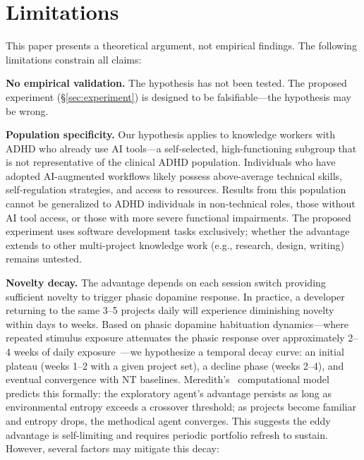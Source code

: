 \documentclass[sigconf,nonacm]{acmart}
\begin{document}
\section{Limitations}
\label{sec:limitations}

This paper presents a theoretical argument, not empirical findings. The following limitations constrain all claims:

\textbf{No empirical validation.} The hypothesis has not been tested. The proposed experiment (\S\ref{sec:experiment}) is designed to be falsifiable---the hypothesis may be wrong.

\textbf{Population specificity.} Our hypothesis applies to knowledge workers with ADHD who already use AI tools---a self-selected, high-functioning subgroup that is not representative of the clinical ADHD population. Individuals who have adopted AI-augmented workflows likely possess above-average technical skills, self-regulation strategies, and access to resources. Results from this population cannot be generalized to ADHD individuals in non-technical roles, those without AI tool access, or those with more severe functional impairments. The proposed experiment uses software development tasks exclusively; whether the advantage extends to other multi-project knowledge work (e.g., research, design, writing) remains untested.

\textbf{Novelty decay.} The advantage depends on each session switch providing sufficient novelty to trigger phasic dopamine response. In practice, a developer returning to the same 3--5 projects daily will experience diminishing novelty within days to weeks. Based on phasic dopamine habituation dynamics---where repeated stimulus exposure attenuates the phasic response over approximately 2--4 weeks of daily exposure~\cite{grace2001}---we hypothesize a temporal decay curve: an initial plateau (weeks 1--2 with a given project set), a decline phase (weeks 2--4), and eventual convergence with NT baselines. Meredith's~\cite{meredith2025} computational model predicts this formally: the exploratory agent's advantage persists as long as environmental entropy exceeds a crossover threshold; as projects become familiar and entropy drops, the methodical agent converges. This suggests the eddy advantage is self-limiting and requires periodic portfolio refresh to sustain. However, several factors may mitigate this decay:
\end{document}
